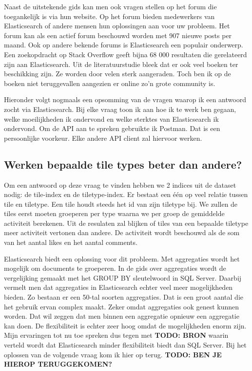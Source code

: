 Naast de uitstekende gids kan men ook vragen stellen op het forum die toegankelijk is via hun website. Op het forum bieden medewerkers van Elasticsearch of andere mensen hun oplossingen aan voor uw probleem. Het forum kan als een actief forum beschouwd worden met 907 nieuwe posts per maand. Ook op andere bekende forums is Elasticsearch een populair onderwerp. Een zoekopdracht op Stack Overflow geeft bijna 68 000 resultaten die gerelateerd zijn aan Elasticsearch. Uit de literatuurstudie bleek dat er ook veel boeken ter beschikking zijn. Ze worden door velen sterk aangeraden. Toch ben ik op de boeken niet teruggevallen aangezien er online zo'n grote community is. 

Hieronder volgt nogmaals een opsomming van de vragen waarop ik een antwoord zocht via Elasticsearch. Bij elke vraag toon ik aan hoe ik te werk ben gegaan, welke moeilijkheden ik ondervond en welke sterktes van Elasticsearch ik ondervond. Om de API aan te spreken gebruikte ik Postman. Dat is een persoonlijke voorkeur. Elke andere API client zal hiervoor werken.

\subsection{Werken bepaalde tile types beter dan andere?}
Om een antwoord op deze vraag te vinden hebben we 2 indices uit de dataset nodig: de tile-index en de tiletype-index. Er bestaat een één op veel relatie tussen tile en tiletype. Een tile houdt steeds het id van zijn tiletype bij. We zullen de tiles eerst moeten groeperen per type waarna we per groep de gemiddelde activiteit berekenen. Uit de resulaten zal blijken of tiles van een bepaalde tiletype meer activiteit vertonen dan andere. De activiteit wordt beschouwd als de som van het aantal likes en het aantal comments.

Elasticsearch biedt een oplossing voor dit probleem. Met aggregaties wordt het mogelijk om documents te groeperen. In de gids over aggregaties wordt de vergelijking gemaakt met het GROUP BY sleutelwoord in SQL Server. Daarbij vermelt men dat aggregaties in Elasticsearch echter veel meer mogelijkheden bieden. Zo bestaan er een 50-tal soorten aggregaties. Dat is een groot aantal die het gebruik ervan complex maakt. Zeker omdat aggregaties ook genest kunnen worden. Dat wil zeggen dat men binnen een aggregatie opnieuw een aggregatie kan doen. De flexibiliteit is echter zeer hoog omdat de mogelijkheden enorm zijn. Mijn ervaringen tot nu toe spreken dus tegen met \textbf{TODO: BRON} waarin verteld wordt dat Elasticsearch minder flexibiliteit biedt dan SQL Server. Bij het oplossen van de volgende vraag kom ik hier op terug. \textbf{TODO: BEN JE HIEROP TERUGGEKOMEN?}


